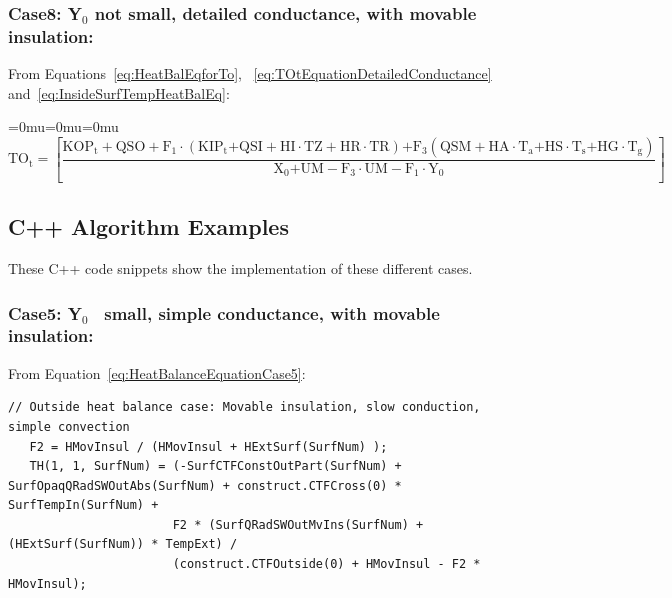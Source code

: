 \subsubsection{Case8: Y\(_{0}\) not small, detailed conductance, with movable insulation:}\label{case8-yux5f0-not-small-detailed-conductance-with-movable-insulation}

From Equations~\ref{eq:HeatBalEqforTo}, ~\ref{eq:TOtEquationDetailedConductance} and~\ref{eq:InsideSurfTempHeatBalEq}:

{\medmuskip=0mu\thinmuskip=0mu\thickmuskip=0mu\nulldelimiterspace=0pt\scriptspace=0pt
\begin{equation}
{\mathrm{T}}{{\mathrm{O}}_{\mathrm{t}}}{\mathrm{ = }}\left[ {\frac{{{\mathrm{KO}}{{\mathrm{P}}_{\mathrm{t}}} + {\mathrm{QSO}} + {{\mathrm{F}}_1}\cdot \left( {{\mathrm{KI}}{{\mathrm{P}}_{\mathrm{t}}}{\mathrm{ + QSI + HI}}\cdot {\mathrm{TZ + HR}}\cdot {\mathrm{TR}}} \right){\mathrm{ + }}{{\mathrm{F}}_{\mathrm{3}}}\left( {{\mathrm{QSM + HA}}\cdot {{\mathrm{T}}_{\mathrm{a}}}{\mathrm{ + HS}}\cdot {{\mathrm{T}}_{\mathrm{s}}}{\mathrm{ + HG}}\cdot {{\mathrm{T}}_{\mathrm{g}}}} \right)}}{{{{\mathrm{X}}_{\mathrm{0}}}{\mathrm{ + UM - }}{{\mathrm{F}}_{\mathrm{3}}}\cdot {\mathrm{UM - }}{{\mathrm{F}}_{\mathrm{1}}}\cdot {{\mathrm{Y}}_{\mathrm{0}}}}}} \right]{\mathrm{  }}
\label{eq:HeatBalanceEquationCase8}
\end{equation}}

\subsection{C++ Algorithm Examples}\label{c++-algorithm-examples}

These C++ code snippets show the implementation of these different cases.

\subsubsection{Case5: Y\(_{0}\)~ small, simple conductance, with movable insulation:}\label{case5-yux5f0-small-simple-conductance-with-movable-insulation-1}

From Equation~\ref{eq:HeatBalanceEquationCase5}:

\begin{lstlisting}
// Outside heat balance case: Movable insulation, slow conduction, simple convection
   F2 = HMovInsul / (HMovInsul + HExtSurf(SurfNum) );
   TH(1, 1, SurfNum) = (-SurfCTFConstOutPart(SurfNum) + SurfOpaqQRadSWOutAbs(SurfNum) + construct.CTFCross(0) * SurfTempIn(SurfNum) +
                       F2 * (SurfQRadSWOutMvIns(SurfNum) + (HExtSurf(SurfNum)) * TempExt) /
                       (construct.CTFOutside(0) + HMovInsul - F2 * HMovInsul);
\end{lstlisting}

